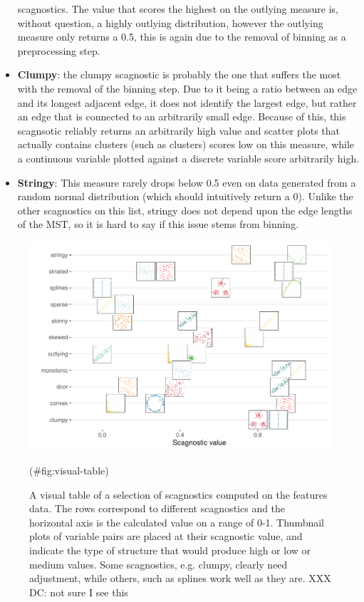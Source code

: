 \begin{itemize}
  scagnostics. The value that scores the highest on the outlying measure
  is, without question, a highly outlying distribution, however the
  outlying measure only returns a 0.5, this is again due to the removal
  of binning as a preprocessing step.
\item
  \textbf{Clumpy}: the clumpy scagnostic is probably the one that
  suffers the most with the removal of the binning step. Due to it being
  a ratio between an edge and its longest adjacent edge, it does not
  identify the largest edge, but rather an edge that is connected to an
  arbitrarily small edge. Because of this, this scagnsotic reliably
  returns an arbitrarily high value and scatter plots that actually
  contains clusters (such as clusters) scores low on this measure, while
  a continuous variable plotted against a discrete variable score
  arbitrarily high.
\item
  \textbf{Stringy}: This measure rarely drops below 0.5 even on data
  generated from a random normal distribution (which should intuitively
  return a 0). Unlike the other scagnostics on this list, stringy does
  not depend upon the edge lengths of the MST, so it is hard to say if
  this issue stems from binning.
\end{itemize}

\begin{Schunk}
\begin{figure}
\includegraphics[width=1\linewidth]{mason-lee-laa-cook_files/figure-latex/visual-table-1} \caption[A visual table of a selection of scagnostics computed on the features data]{A visual table of a selection of scagnostics computed on the features data. The rows correspond to different scagnostics and the horizontal axis is the calculated value on a range of 0-1. Thumbnail plots of variable pairs are placed at their scagnostic value, and indicate the type of structure that would produce high or low or medium values. Some scagnostics, e.g. clumpy, clearly need adjustment, while others, such as splines work well as they are. XXX DC: not sure I see this}(\#fig:visual-table)
\end{figure}
\end{Schunk}


